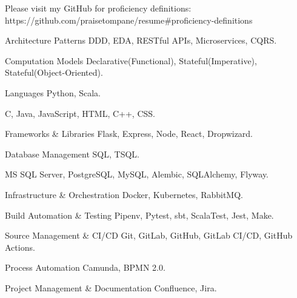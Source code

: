     \begin{cvparagraph}

        \:\:\:\:\:\:\:\:\:\:\:\:\:\:\:\:\:\:\:\:\:\:\:\:Please visit my GitHub for proficiency definitions: https://github.com/praisetompane/resume\#proficiency-definitions
    \end{cvparagraph}
    \begin{cvskills}
        \cvskill
            {Architecture Patterns}
            { DDD, EDA, RESTful APIs, Microservices, CQRS.}

        \cvskill
            {Computation Models}
            { Declarative(Functional), Stateful(Imperative), Stateful(Object-Oriented).}

        \cvskill
            {Languages}
            { Python, Scala.}

        \cvskill
            {}
            { C, Java, JavaScript, HTML, C++, CSS.}

        \cvskill
            {Frameworks \& Libraries}
            { Flask, Express, Node, React, Dropwizard.}

        \cvskill
            {Database Management}
            { SQL, TSQL.}

        \cvskill
            {}
            { MS SQL Server, PostgreSQL, MySQL, Alembic, SQLAlchemy, Flyway.}

        \cvskill
            {Infrastructure \& Orchestration}
            { Docker, Kubernetes, RabbitMQ.}

        \cvskill
            {Build Automation \& Testing}
            { Pipenv, Pytest, sbt, ScalaTest, Jest, Make.}

        \cvskill
            {Source Management \& CI/CD}
            { Git, GitLab, GitHub, GitLab CI/CD, GitHub Actions.}

        \cvskill
            {Process Automation}
            { Camunda, BPMN 2.0.}

        \cvskill
            {Project Management \& Documentation}
            { Confluence, Jira.}
    \end{cvskills}
